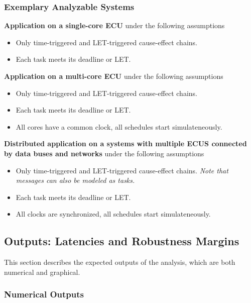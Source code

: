 



\subsubsection{Exemplary Analyzable Systems}
\label{sec:system-model-examples}

\textbf{Application on a single-core ECU} under the following assumptions
\begin{itemize}
	\item Only time-triggered and LET-triggered cause-effect chains.
	\item Each task meets its deadline or LET.
\end{itemize}

\textbf{Application on a multi-core ECU} under the following assumptions
\begin{itemize}
	\item Only time-triggered and LET-triggered cause-effect chains.
	\item Each task meets its deadline or LET.
	\item All cores have a common clock, all schedules start simulateneously.
\end{itemize}
%
\textbf{Distributed application on a systems with multiple ECUS connected by data buses and networks} under the following assumptions
	\begin{itemize}
	\item Only time-triggered and LET-triggered cause-effect chains. 
	\emph{Note that messages can also be modeled as tasks.}
	\item Each task meets its deadline or LET.
	\item All clocks are synchronized, all schedules start simulateneously.
\end{itemize} 
	


\subsection{Outputs: Latencies and Robustness Margins}
This section describes the expected outputs of the analysis, which are both numerical and graphical.


\subsubsection{Numerical Outputs}

